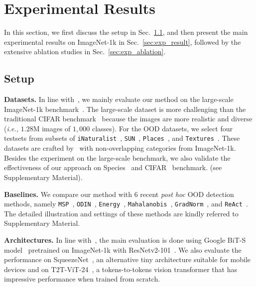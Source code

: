 \section{Experimental Results}

In this section, we first discuss the setup in Sec.~\ref{sec:exp_setup}, and then present the main experimental results on ImageNet-1k in Sec.~\ref{sec:exp_result}, 
followed by the extensive ablation studies in Sec.~\ref{sec:exp_ablation}.

\subsection{Setup}
\label{sec:exp_setup}

\noindent \textbf{Datasets.} In line with~\cite{huang2021mos,sun2021react,huang2021importance}, we mainly evaluate our method on the large-scale ImageNet-1k benchmark~\cite{deng2009imagenet}. The large-scale dataset is more challenging than the traditional CIFAR benchmark~\cite{krizhevsky2009learning} because the images are more realistic and diverse (\emph{i.e.,} $1.28$M images of $1,000$ classes). For the OOD datasets, we select four testsets from subsets of \texttt{iNaturalist}~\cite{van2018inaturalist}, \texttt{SUN}~\cite{xiao2010sun}, \texttt{Places}~\cite{zhou2017places}, and \texttt{Textures}~\cite{cimpoi2014describing}. These datasets are crafted by~\cite{huang2021mos} with non-overlapping categories from ImageNet-1k. Besides the experiment on the large-scale benchmark, we also validate the effectiveness of our approach on Species~\cite{hendrycks2019scaling} and CIFAR~\cite{krizhevsky2009learning} benchmark. (see Supplementary Material).



\noindent \textbf{Baselines.}
We compare our method with $6$ recent \emph{post hoc} OOD detection methods, namely \texttt{MSP}~\cite{hendrycks2016baseline}, \texttt{ODIN}~\cite{liang2017enhancing}, \texttt{Energy}~\cite{liu2020energy}, \texttt{Mahalanobis}~\cite{lee2018simple}, \texttt{GradNorm}~\cite{huang2021importance}, and \texttt{ReAct}~\cite{sun2021react}. The detailed illustration and settings of these methods are kindly referred to Supplementary Material.

\noindent \textbf{Architectures.} In line with~\cite{huang2021importance}, the main evaluation is done using Google BiT-S model~\cite{kolesnikov2020big} pretrained on ImageNet-1k with ResNetv2-101~\cite{he2016identity}. We also evaluate the performance on SqueezeNet~\cite{iandola2016squeezenet}, an alternative tiny architecture suitable for mobile devices and on T2T-ViT-24~\cite{yuan2021tokens}, a tokens-to-tokens vision transformer that has impressive performance when trained from scratch. 

